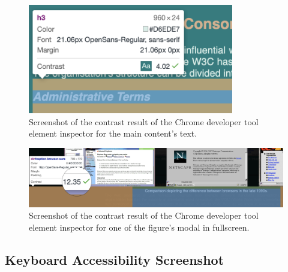 \documentclass[letterpaper,12pt]{article}
\begin{document}
\begin{appendices}
\begin{figure}[h] 
\centerline{\includegraphics[width=0.8\textwidth]{report/images/accessibility-contrast-text.png}}
\caption{\label{fig:accessibility-contrast-text}Screenshot of the contrast result of the Chrome developer tool element inspector for the main content's text.}
\end{figure}

\begin{figure}[ht] 
\centerline{\includegraphics[width=\textwidth]{report/images/accessibility-contrast-modal.png}}
\caption{\label{fig:accessibility-contrast-modal}Screenshot of the contrast result of the Chrome developer tool element inspector for one of the figure's modal in fullscreen.}
\end{figure}

\subsection{Keyboard Accessibility Screenshot}
\label{sec:appendix-accessibility-results-keyboard}


\end{appendices}
\end{document}
